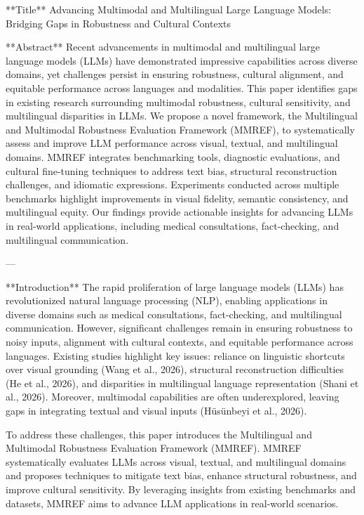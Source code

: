 **Title**  
Advancing Multimodal and Multilingual Large Language Models: Bridging Gaps in Robustness and Cultural Contexts  

**Abstract**  
Recent advancements in multimodal and multilingual large language models (LLMs) have demonstrated impressive capabilities across diverse domains, yet challenges persist in ensuring robustness, cultural alignment, and equitable performance across languages and modalities. This paper identifies gaps in existing research surrounding multimodal robustness, cultural sensitivity, and multilingual disparities in LLMs. We propose a novel framework, the Multilingual and Multimodal Robustness Evaluation Framework (MMREF), to systematically assess and improve LLM performance across visual, textual, and multilingual domains. MMREF integrates benchmarking tools, diagnostic evaluations, and cultural fine-tuning techniques to address text bias, structural reconstruction challenges, and idiomatic expressions. Experiments conducted across multiple benchmarks highlight improvements in visual fidelity, semantic consistency, and multilingual equity. Our findings provide actionable insights for advancing LLMs in real-world applications, including medical consultations, fact-checking, and multilingual communication.  

---

**Introduction**  
The rapid proliferation of large language models (LLMs) has revolutionized natural language processing (NLP), enabling applications in diverse domains such as medical consultations, fact-checking, and multilingual communication. However, significant challenges remain in ensuring robustness to noisy inputs, alignment with cultural contexts, and equitable performance across languages. Existing studies highlight key issues: reliance on linguistic shortcuts over visual grounding (Wang et al., 2026), structural reconstruction difficulties (He et al., 2026), and disparities in multilingual language representation (Shani et al., 2026). Moreover, multimodal capabilities are often underexplored, leaving gaps in integrating textual and visual inputs (Hüsünbeyi et al., 2026).  

To address these challenges, this paper introduces the Multilingual and Multimodal Robustness Evaluation Framework (MMREF). MMREF systematically evaluates LLMs across visual, textual, and multilingual domains and proposes techniques to mitigate text bias, enhance structural robustness, and improve cultural sensitivity. By leveraging insights from existing benchmarks and datasets, MMREF aims to advance LLM applications in real-world scenarios.  

